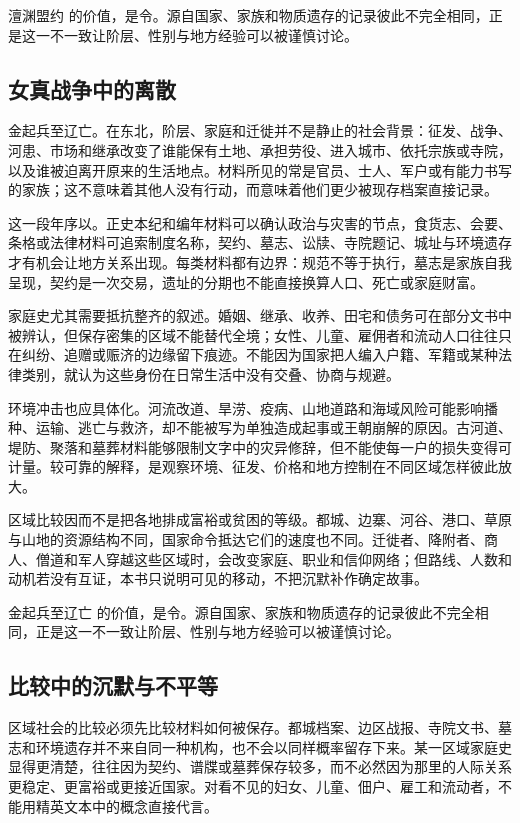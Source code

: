 澶渊盟约 的价值，是令。源自国家、家族和物质遗存的记录彼此不完全相同，正是这一不一致让阶层、性别与地方经验可以被谨慎讨论。

\subsection{女真战争中的离散}

金起兵至辽亡。在东北，阶层、家庭和迁徙并不是静止的社会背景：征发、战争、河患、市场和继承改变了谁能保有土地、承担劳役、进入城市、依托宗族或寺院，以及谁被迫离开原来的生活地点。材料所见的常是官员、士人、军户或有能力书写的家族；这不意味着其他人没有行动，而意味着他们更少被现存档案直接记录。

这一段年序以。正史本纪和编年材料可以确认政治与灾害的节点，食货志、会要、条格或法律材料可追索制度名称，契约、墓志、讼牍、寺院题记、城址与环境遗存才有机会让地方关系出现。每类材料都有边界：规范不等于执行，墓志是家族自我呈现，契约是一次交易，遗址的分期也不能直接换算人口、死亡或家庭财富。

家庭史尤其需要抵抗整齐的叙述。婚姻、继承、收养、田宅和债务可在部分文书中被辨认，但保存密集的区域不能替代全境；女性、儿童、雇佣者和流动人口往往只在纠纷、追赠或赈济的边缘留下痕迹。不能因为国家把人编入户籍、军籍或某种法律类别，就认为这些身份在日常生活中没有交叠、协商与规避。

环境冲击也应具体化。河流改道、旱涝、疫病、山地道路和海域风险可能影响播种、运输、逃亡与救济，却不能被写为单独造成起事或王朝崩解的原因。古河道、堤防、聚落和墓葬材料能够限制文字中的灾异修辞，但不能使每一户的损失变得可计量。较可靠的解释，是观察环境、征发、价格和地方控制在不同区域怎样彼此放大。

区域比较因而不是把各地排成富裕或贫困的等级。都城、边寨、河谷、港口、草原与山地的资源结构不同，国家命令抵达它们的速度也不同。迁徙者、降附者、商人、僧道和军人穿越这些区域时，会改变家庭、职业和信仰网络；但路线、人数和动机若没有互证，本书只说明可见的移动，不把沉默补作确定故事。

金起兵至辽亡 的价值，是令。源自国家、家族和物质遗存的记录彼此不完全相同，正是这一不一致让阶层、性别与地方经验可以被谨慎讨论。

\subsection{比较中的沉默与不平等}

区域社会的比较必须先比较材料如何被保存。都城档案、边区战报、寺院文书、墓志和环境遗存并不来自同一种机构，也不会以同样概率留存下来。某一区域家庭史显得更清楚，往往因为契约、谱牒或墓葬保存较多，而不必然因为那里的人际关系更稳定、更富裕或更接近国家。对看不见的妇女、儿童、佃户、雇工和流动者，不能用精英文本中的概念直接代言。


